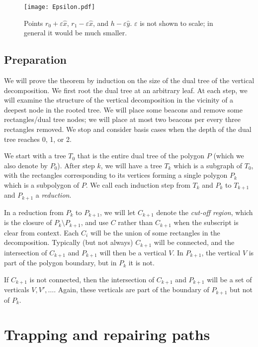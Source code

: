 \documentclass{article}
\begin{document}
	\begin{figure}[htbp] 
		\begin{center}
		    \texttt{[image: Epsilon.pdf]}
		\end{center}
		\caption{
			Points $r_0 + \varepsilon \hat{x}$, $r_1 -
			\varepsilon \hat{x}$, and $h - \varepsilon \hat{y}$.
			$\varepsilon$ is not shown to scale; in
			general it would be much smaller.
		}
		\label{fig:epsilon}
	\end{figure}
	
		
\subsection{Preparation}
	We will prove the theorem by induction on the size of the dual tree of the
	vertical decomposition.
	We first root the dual tree at an arbitrary leaf.
	At each step, we will examine the structure of the vertical decomposition
	in the vicinity of a deepest node in the rooted tree. 
	We will place some beacons and remove some
	rectangles/dual tree nodes;
	we will place at most two beacons per every three rectangles removed.
	We stop and consider basis cases when the depth of the dual tree reaches
	0, 1, or 2.
	
	We start with a tree $T_0$ that is the entire dual tree
	of the polygon $P$ (which we also denote by $P_0$).
	After step $k$, we will have a tree $T_k$ which is a subgraph of $T_0$,
	with the rectangles corresponding to its vertices forming a 
	single polygon $P_k$ which is a subpolygon of $P$.
	We call each induction step from $T_k$ and $P_k$ to $T_{k+1}$ and $P_{k+1}$ a
	\emph{reduction}.
	
	In a reduction from $P_k$ to $P_{k+1}$, we will let $C_{k+1}$ denote the
	\emph{cut-off region}, which is the closure of $P_k \setminus P_{k+1}$,
	and use $C$ rather than $C_{k+1}$ when the subscript is clear from context.
	Each $C_{i}$ will be the union of some rectangles in the
	decomposition.
	Typically (but not always) $C_{k+1}$ will be connected, and the intersection of
	$C_{k+1}$ and $P_{k+1}$ will then be a vertical $V$.
	In $P_{k+1}$, the vertical $V$ is part of the polygon boundary, but in $P_k$ it
	is not.
	
	If $C_{k+1}$ is not connected, then the intersection of $C_{k+1}$ and $P_{k+1}$
	will be a set of verticals $V, V', \ldots$.  Again, these verticals are part of
	the boundary of $P_{k+1}$ but not of $P_{k}$.
	 



\section{Trapping and repairing paths}\label{sec:repair} 
\end{document}
